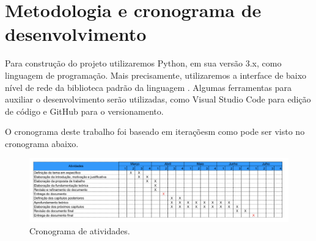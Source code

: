 \chapter{\label{chap:chap4} Metodologia e cronograma de desenvolvimento}
Para construção do projeto utilizaremos Python\cite{python}, em sua versão 3.x, como linguagem de programação.
Mais precisamente, utilizaremos a interface de baixo nível de rede da biblioteca padrão da linguagem \cite{socketPython}.
Algumas ferramentas para auxiliar o desenvolvimento serão utilizadas, como Visual Studio Code\cite{vscode} para edição de código e GitHub\cite{github} para o versionamento.

O cronograma deste trabalho foi baseado em iteraçõesm como pode ser visto no cronograma abaixo.
\begin{figure}[htb!]
    \centering\includegraphics[width=1\textwidth]{fig3.pdf}
    \caption%
    {\label{fig:fig3} Cronograma de atividades.}
\end{figure}



